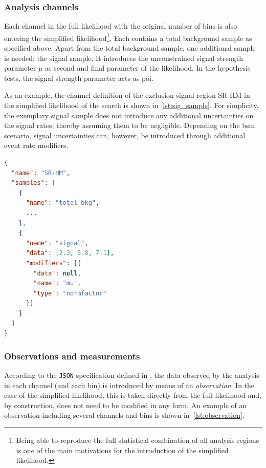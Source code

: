\subsubsection{Analysis channels}

Each channel in the full likelihood with the original number of bins is also entering the simplified likelihood\footnote{Being able to reproduce the full statistical combination of all analysis regions is one of the main motivations for the introduction of the simplified likelihood.}.
Each contains a total background sample as specified above.
Apart from the total background sample, one additional sample is needed: the signal sample.
It introduces the unconstrained signal strength parameter $\mu$ as second and final parameter of the likelihood. In the hypothesis tests, the signal strength parameter acts as \gls{poi}.

As an example, the channel definition of the exclusion signal region SR-HM in the simplified likelihood of the \onelepton search is shown in \cref{lst:sig_sample}. For simplicity, the exemplary signal sample does not introduce any additional uncertainties on the signal rates, thereby assuming them to be negligible. Depending on the \gls{bsm} scenario, signal uncertainties can, however, be introduced through additional event rate modifiers.

\begin{minipage}{\linewidth}
\begin{lstlisting}[language=json,firstnumber=1,caption={Channel definition of the exclusion signal region SR-HM of the \onelepton search. The exemplary signal sample with sample rate and unconstrained normalisation parameter does not introduce any additional uncertainties. The three dots `\dots' contain the remaining definition for the total background sample from \cref{lst:bkg_sample}.},captionpos=b, label=lst:sig_sample]
{
  "name": "SR-HM",
  "samples": [
    {
      "name": "total_bkg",
      ...
    },
    {
      "name": "signal",
      "data": [2.3, 5.8, 7.1],
      "modifiers": [{
        "data": null, 
        "name": "mu", 
        "type": "normfactor"
      }]
    }
  ]
}
\end{lstlisting}
\end{minipage}

\subsubsection{Observations and measurements}

According to the \texttt{JSON} specification defined in \cite{ATL-PHYS-PUB-2019-029}, the data observed by the analysis in each channel (and each bin) is introduced by means of an \textit{observation}. In the case of the simplified likelihood, this is taken directly from the full likelihood and, by construction, does not need to be modified in any form. An example of an observation including several channels and bins is shown in~\cref{lst:observation}.

